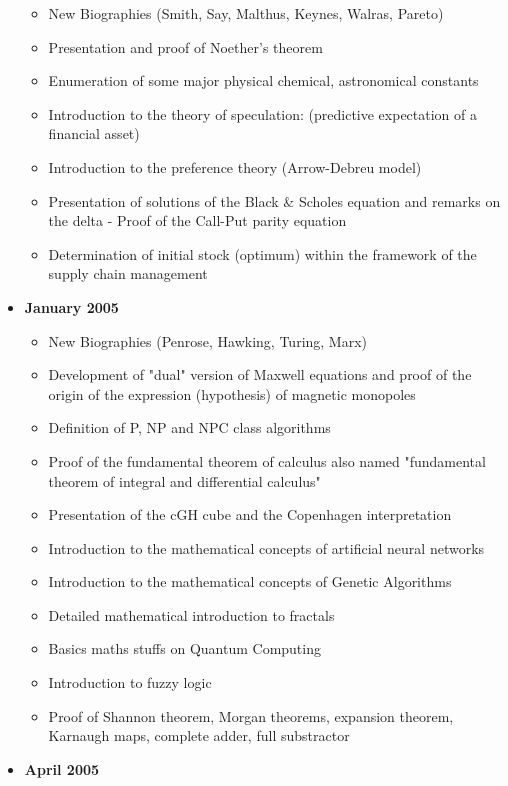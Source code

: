 \documentclass[12pt,a4paper,twoside,openright]{report}
\theoremstyle{definition}
\theoremstyle{itexmp}
\numberwithin{equation}{section}
\begin{document}
\begin{itemize}
			\begin{itemize}[noitemsep]
				\item New Biographies (Smith, Say, Malthus, Keynes, Walras, Pareto)
			\item Presentation and proof of Noether's theorem
			\item Enumeration of some major physical chemical, astronomical constants
			\item Introduction to the theory of speculation: (predictive expectation of a financial asset)
			\item Introduction to the preference theory (Arrow-Debreu model)
			\item Presentation of solutions of the Black \& Scholes equation and remarks on the delta - Proof of the Call-Put parity equation
			\item Determination of initial stock (optimum) within the framework of the supply chain management
			\end{itemize}
		\item \textbf{January 2005}
			\begin{itemize}[noitemsep]
				\item New Biographies (Penrose, Hawking, Turing, Marx) 
				\item Development of "dual" version of Maxwell equations and proof of the origin of the expression (hypothesis) of magnetic monopoles 
				\item Definition of P, NP and NPC class algorithms
				\item Proof of the fundamental theorem of calculus also named "fundamental theorem of integral and differential calculus" 
				\item Presentation of the cGH cube and the Copenhagen interpretation 
				\item Introduction to the mathematical concepts of artificial neural networks 
				\item Introduction to the mathematical concepts of Genetic Algorithms
				\item Detailed mathematical introduction to fractals
				\item Basics maths stuffs on Quantum Computing
				\item Introduction to fuzzy logic
				\item Proof of Shannon theorem, Morgan theorems, expansion theorem, Karnaugh maps, complete adder, full substractor
			\end{itemize}
		\item \textbf{April 2005}
			\begin{itemize}[noitemsep]

\end{itemize}
\end{itemize}
\end{document}
